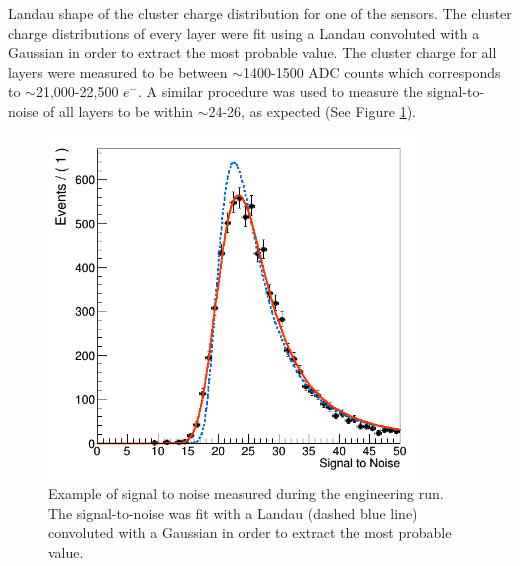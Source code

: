 Landau shape of the cluster charge distribution for one of the sensors.
The cluster charge distributions of every layer were fit using a Landau
convoluted with a Gaussian in order to extract the most probable value.  The 
cluster charge for all layers were measured to be between $\sim$1400-1500 ADC counts
which corresponds to $\sim$21,000-22,500 $e^{-}$.  A similar procedure was used
to measure the signal-to-noise of all layers to be within $\sim$24-26, 
as expected (See Figure \ref{fig:sig_noise}).
\begin{figure}[h!t]
    \centering
    \includegraphics[width=.7\textwidth]{images/sig_noise.png}
    \caption{Example of signal to noise measured during the engineering run.
             The signal-to-noise was fit with a Landau (dashed blue line) 
             convoluted with a Gaussian in order to extract the most probable 
             value.}
    \label{fig:sig_noise}
\end{figure}  

